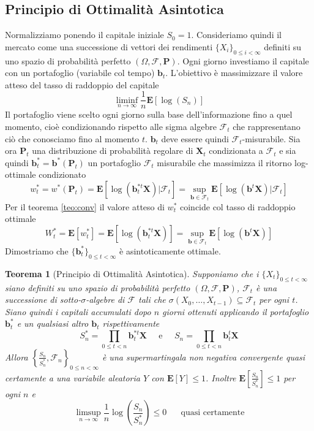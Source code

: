 \documentclass[a4paper,11pt]{book}
\theoremstyle{plain}
\newtheorem{teo}{Teorema}[chapter]
\theoremstyle{definition}
\theoremstyle{remark}
\newcommand{\X}{\bm{X}}
\newcommand{\B}{\bm{b}}
\newcommand{\F}{\mathcal{F}}
\newcommand{\Pro}{\mathbf{P}}
\newcommand{\E}{\mathbf{E}}
\begin{document}
\subsection{Principio di Ottimalità Asintotica}
Normalizziamo ponendo il capitale iniziale $S_0 = 1$. Consideriamo quindi il mercato come una successione di vettori dei rendimenti $\{X_i\}_{0\leq i<\infty}$ definiti su uno spazio di probabilità perfetto $(\Omega, \mathcal{F}, \mathbf{P})$. Ogni giorno investiamo il capitale con un portafoglio (variabile col tempo) $\bm{b}_t$.\newline
L'obiettivo è massimizzare il valore atteso del tasso di raddoppio del capitale 
\begin{equation*}
\liminf\limits_{n\to \infty} \frac{1}{n}\E[\log(S_n)]
\end{equation*}
Il portafoglio viene scelto ogni giorno sulla base dell'informazione fino a quel momento, cioè condizionando rispetto alle sigma algebre $\mathcal{F}_t$ che rappresentano ciò che conosciamo fino al momento $t$. $\B_t$ deve essere quindi $\F_t$-misurabile.\newline
Sia ora $\Pro_t$ una distribuzione di probabilità regolare di $\X_t$ condizionata a $\F_t$ e sia quindi $\B^*_t = \B^*(\Pro_t)$ un portafoglio $\F_t$ misurabile che massimizza il ritorno log-ottimale condizionato
\begin{equation*}
	w_t^*=w^*(\Pro_t)= \E[\log(\B^{*t}_{t}\X)|\F_t] = \sup\limits_{\B\in \F_t}\E[\log(\B^t\X)|\F_t]
\end{equation*}
Per il teorema \ref{teo:conv} il valore atteso di $w_t^*$ coincide col tasso di raddoppio ottimale
\begin{equation*}
	W_t^*=\E[w^*_t]= \E[\log(\B^{*t}_{t}\X)] = \sup\limits_{\B\in \F_t}\E[\log(\B^t\X)]
\end{equation*}
Dimostriamo che $\{\B_t^*\}_{0\leq t < \infty}$ è asintoticamente ottimale.
\begin{teo}[Principio di Ottimalità Asintotica]
	Supponiamo che i $\{X_t\}_{0\leq t<\infty}$ siano definiti su uno spazio di probabilità perfetto $(\Omega, \mathcal{F}, \mathbf{P})$, $\F_t$ è una successione di sotto-$\sigma$-algebre di $\F$ tali che $\sigma(X_0,\ldots, X_{t-1})\subseteq \F_t$ per ogni $t$. Siano quindi i capitali accumulati dopo $n$ giorni ottenuti applicando il portafoglio $\B_t^*$ e un qualsiasi altro $\B_t$ rispettivamente
	\begin{equation*}
		S_n^*=\prod_{0\leq t <n}{\B_t^{*t}\X} \;\;\;\;\; \text{e} \;\;\;\;\; S_n=\prod_{0\leq t <n}{\B_t^t\X}
	\end{equation*}
	Allora $\left\{\frac{S_n}{S^*_n}, \F_n\right\}_{0\leq n <\infty}$ è una supermartingala non negativa convergente quasi certamente a una variabile aleatoria $Y$ con $\E[Y]\leq 1$. Inoltre $\E\left[\frac{S_n}{S_n^*}\right]\leq 1$ per ogni $n$ e
	\begin{equation*}
		\limsup\limits_{n\to\infty}\frac{1}{n}\log\left(\frac{S_n}{S_n^*}\right)\leq 0 \;\;\;\;\;\; \text{quasi certamente}
	\end{equation*}
\end{teo}
\end{document}
